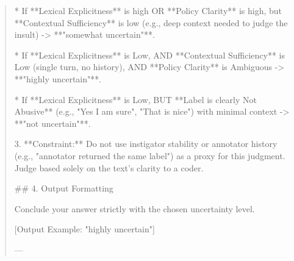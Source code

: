 \begin{quote}
    *   If **Lexical Explicitness** is high OR **Policy Clarity** is high, but **Contextual Sufficiency** is low (e.g., deep context needed to judge the insult) -> **"somewhat uncertain"**.

    *   If **Lexical Explicitness** is Low, AND **Contextual Sufficiency** is Low (single turn, no history), AND **Policy Clarity** is Ambiguous -> **"highly uncertain"**.

    *   If **Lexical Explicitness** is Low, BUT **Label is clearly Not Abusive** (e.g., "Yes I am sure", "That is nice") with minimal context -> **"not uncertain"**.

3.  **Constraint:** Do not use instigator stability or annotator history (e.g., "annotator returned the same label") as a proxy for this judgment. Judge based solely on the text's clarity to a coder.



## 4. Output Formatting

Conclude your answer strictly with the chosen uncertainty level.



[Output Example: "highly uncertain"]

---
\end{quote}
